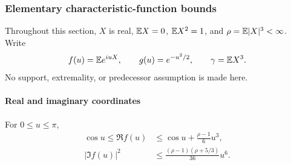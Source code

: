 \subsubsection{Elementary characteristic-function bounds}
\label{ms:fourier:afcore:sec:fourier}

Throughout this section, $X$ is real, $\mathbb E X=0$, $\mathbb E X^2=1$, and
$\rho=\mathbb E|X|^3<\infty$. Write
\[
 f(u)=\mathbb E e^{iuX},\qquad g(u)=e^{-u^2/2},\qquad \gamma=\mathbb E X^3.
\]
No support, extremality, or predecessor assumption is made here.

\paragraph{Real and imaginary coordinates}

\begin{lemma}\label{ms:fourier:afcore:lem:anchor}
For $0\le u\le\pi$,
\begin{align}
 \cos u\le\Re f(u)&\le\cos u+\frac{\rho-1}{6}u^3,
 \label{ms:fourier:afcore:eq:real-anchor}\\
 |\Im f(u)|^2&\le\frac{(\rho-1)(\rho+5/3)}{36}u^6.
 \label{ms:fourier:afcore:eq:imag-anchor}
\end{align}
\end{lemma}
